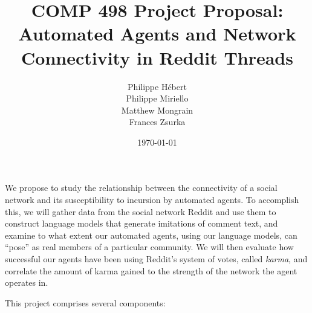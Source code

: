 \documentclass[12pt]{article}
\title{
    COMP 498 Project Proposal: \\
    Automated Agents and Network Connectivity in Reddit Threads
 }
\author{
    Philippe H\'ebert \\
    Philippe Miriello \\
    Matthew Mongrain \\
    Frances Zsurka \\
}
\date{\today}
\begin{document}
    \maketitle
    We propose to study the relationship between the connectivity of a social network and its susceptibility to incursion by automated agents. To accomplish this, we will gather data from the social network Reddit and use them to construct language models that generate imitations of comment text, and examine to what extent our automated agents, using our language models, can ``pose'' as real members of a particular community. We will then evaluate how successful our agents have been using Reddit's system of votes, called \textit{karma}, and correlate the amount of karma gained to the strength of the network the agent operates in.

    This project comprises several components:
\end{document}
